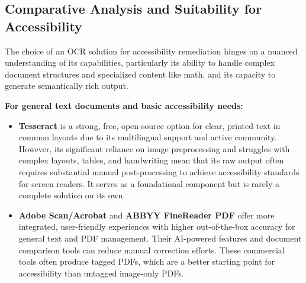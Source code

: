 \subsection{Comparative Analysis and Suitability for Accessibility}

The choice of an OCR solution for accessibility remediation hinges on a nuanced understanding of its capabilities, particularly its ability to handle complex document structures and specialized content like math, and its capacity to generate semantically rich output.

\textbf{For general text documents and basic accessibility needs:}
\begin{itemize}
    \item \textbf{Tesseract} is a strong, free, open-source option for clear, printed text in common layouts due to its multilingual support and active community. However, its significant reliance on image preprocessing and struggles with complex layouts, tables, and handwriting  mean that its raw output often requires substantial manual post-processing to achieve accessibility standards for screen readers. It serves as a foundational component but is rarely a complete solution on its own.
    \item \textbf{Adobe Scan/Acrobat} and \textbf{ABBYY FineReader PDF} offer more integrated, user-friendly experiences with higher out-of-the-box accuracy for general text and PDF management. Their AI-powered features and document comparison tools can reduce manual correction efforts. These commercial tools often produce tagged PDFs, which are a better starting point for accessibility than untagged image-only PDFs.
\end{itemize}

